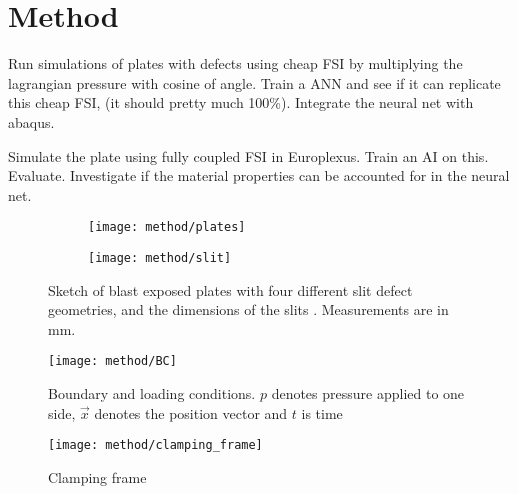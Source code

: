\chapter{Method} \label{chapter:Method}
Run simulations of plates with defects using cheap FSI by multiplying the lagrangian pressure with cosine of angle. Train a ANN and see if it can replicate this cheap FSI, (it should pretty much 100\%). Integrate the neural net with abaqus.

Simulate the plate using fully coupled FSI in Europlexus. Train an AI on this. Evaluate. Investigate if the material properties can be accounted for in the neural net.

\begin{figure}
    \centering
    \begin{subfigure}[b]{0.6\textwidth}
        \centering
        \texttt{[image: method/plates]}
        \caption{}
        \label{fig:plates}
    \end{subfigure}
    \begin{subfigure}[b]{0.39\textwidth}
        \centering
        \texttt{[image: method/slit]}
        \caption{}
        \label{fig:slit}
    \end{subfigure}
    \caption{Sketch of  blast exposed plates with four different slit defect geometries, and  the dimensions of the slits . Measurements are in mm.}
\end{figure}

\begin{figure}
    \centering
    \texttt{[image: method/BC]}
    \caption{Boundary and loading conditions. $p$ denotes pressure applied to one side, $\vec{x}$ denotes the position vector and $t$ is time}
    \label{fig:bc}
\end{figure}

\begin{figure}
    \centering
    \texttt{[image: method/clamping\_frame]}
    \caption{Clamping frame}
    \label{fig:clamping}
\end{figure}